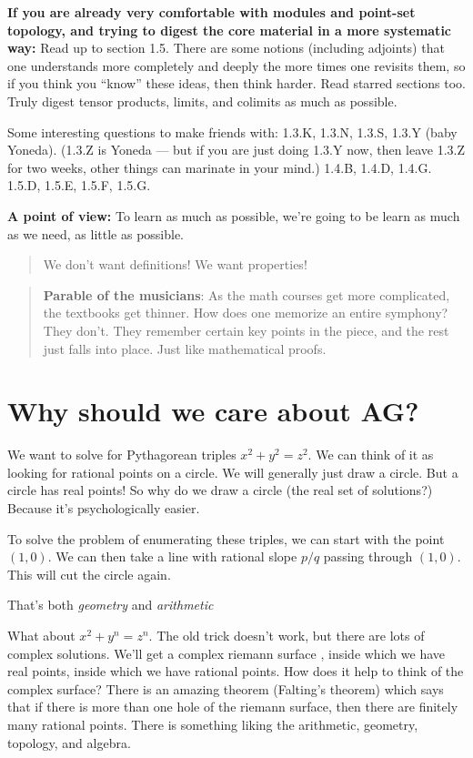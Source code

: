 \documentclass{book}
\theoremstyle{definition}
\begin{document}
\textbf{If you are already very comfortable with modules and point-set topology, and trying to digest the core material in a more systematic way:}
Read up to section 1.5. There are some notions (including adjoints) that one
understands more completely and deeply the more times one revisits them, so if
you think you “know” these ideas, then think harder. Read starred sections too.
Truly digest tensor products, limits, and colimits as much as possible.

Some interesting questions to make friends with: 1.3.K, 1.3.N, 1.3.S, 1.3.Y
(baby Yoneda). (1.3.Z is Yoneda — but if you are just doing 1.3.Y now, then
leave 1.3.Z for two weeks, other things can marinate in your mind.) 1.4.B,
1.4.D, 1.4.G. 1.5.D, 1.5.E, 1.5.F, 1.5.G.

\textbf{A point of view:} To learn as much as possible, we're going to be learn
as much as we need, as little as possible.

\begin{quote} We don't want definitions! We want properties! \end{quote}

\begin{quote}
    \textbf{Parable of the musicians}: As the math courses get more complicated,
    the textbooks get thinner. How does one memorize an entire symphony? They don't.
    They remember certain key points in the piece, and the rest just falls into
    place. Just like mathematical proofs.
\end{quote}

\section{Why should we care about AG?}

We want to solve for Pythagorean triples $x^2 + y^2 = z^2$. We can think of it as looking for rational points
on a circle. We will generally just draw a circle. But a circle has real points!
So why do we draw a circle (the real set of solutions?) Because it's psychologically
easier.

To solve the problem of enumerating these triples, we can start with the point $(1, 0)$.
We can then take a line with rational slope $p/q$ passing through $(1, 0)$. 
This will cut the circle again. 

That's both \emph{geometry} and \emph{arithmetic}

What about $x^2 + y^n = z^n$. The old trick doesn't work, but there are lots
of complex solutions. We'll get a complex riemann surface , inside which we have
real points, inside which we have rational points. How does it help to think
of the complex surface? There is an amazing theorem (Falting's theorem) which
says that if there is more than one hole of the riemann surface, then there are
finitely many rational points. There is something liking the arithmetic, geometry,
topology, and algebra.
\end{document}
